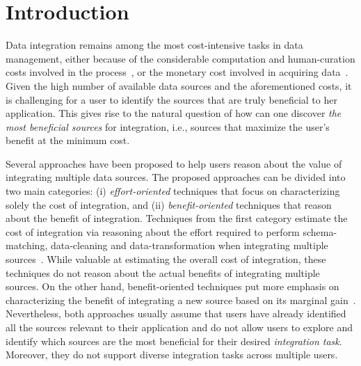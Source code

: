 \documentclass{vldb}
\begin{document}
\section{Introduction}
\label{sec:intro}
Data integration remains among the most cost-intensive tasks in data management, either because of the considerable computation and human-curation costs involved in the process~\cite{kruse2015estimating}, or the monetary cost involved in acquiring data~\cite{balazinska:vldb11}. Given the high number of available data sources and the aforementioned costs, it is challenging for a user to identify the sources that are truly beneficial to her application. This gives rise to the natural question of how can one discover {\em the most beneficial sources} for integration, i.e., sources that maximize the user's benefit at the minimum cost. 

Several approaches have been proposed to help users reason about the value of integrating multiple data sources. The proposed approaches can be divided into two main categories: (i) {\em effort-oriented} techniques that focus on characterizing solely the cost of integration, and (ii) {\em benefit-oriented} techniques that reason about the benefit of integration. Techniques from the first category estimate the cost of integration via reasoning about the effort required to perform schema-matching, data-cleaning and data-transformation when integrating multiple sources~\cite{kruse2015estimating, smith:2009}. While valuable at estimating the overall cost of integration, these techniques do not reason about the actual benefits of integrating multiple sources. On the other hand, benefit-oriented techniques put more emphasis on characterizing the benefit of integrating a new source based on its marginal gain~\cite{dong:vldb13,rekatsinas:2014}. Nevertheless, both approaches usually assume that users have already identified all the sources relevant to their application and do not allow users to explore and identify which sources are the most beneficial for their desired {\em integration task}. Moreover, they do not support diverse integration tasks across multiple users.
\end{document}
